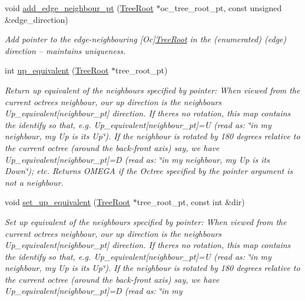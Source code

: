 \begin{DoxyCompactItemize}
void \hyperlink{classoomph_1_1OcTreeRoot_a92ccf3b396de331440c5dcba2e024317}{add\+\_\+edge\+\_\+neighbour\+\_\+pt} (\hyperlink{classoomph_1_1TreeRoot}{Tree\+Root} $\ast$oc\+\_\+tree\+\_\+root\+\_\+pt, const unsigned \&edge\+\_\+direction)
\begin{DoxyCompactList}\small\item\em Add pointer to the edge-\/neighbouring \mbox{[}Oc\mbox{]}\hyperlink{classoomph_1_1TreeRoot}{Tree\+Root} in the (enumerated) (edge) direction -- maintains uniqueness. \end{DoxyCompactList}\item 
int \hyperlink{classoomph_1_1OcTreeRoot_a961a28583236f1b92bc35de064d2dba6}{up\+\_\+equivalent} (\hyperlink{classoomph_1_1TreeRoot}{Tree\+Root} $\ast$tree\+\_\+root\+\_\+pt)
\begin{DoxyCompactList}\small\item\em Return up equivalent of the neighbours specified by pointer\+: When viewed from the current octree\textquotesingle{}s neighbour, our up direction is the neighbour\textquotesingle{}s Up\+\_\+equivalent\mbox{[}neighbour\+\_\+pt\mbox{]} direction. If there\textquotesingle{}s no rotation, this map contains the identify so that, e.\+g. {\ttfamily Up\+\_\+equivalent}\mbox{[}neighbour\+\_\+pt\mbox{]}=U (read as\+: \char`\"{}in my
neighbour, my Up is its Up\char`\"{}). If the neighbour is rotated by 180 degrees relative to the current octree (around the back-\/front axis) say, we have {\ttfamily Up\+\_\+equivalent}\mbox{[}neighbour\+\_\+pt\mbox{]}=D (read as\+: \char`\"{}in my 
neighbour, my Up is its Down\char`\"{}); etc. Returns O\+M\+E\+GA if the Octree specified by the pointer argument is not a neighbour. \end{DoxyCompactList}\item 
void \hyperlink{classoomph_1_1OcTreeRoot_a91210b8fab8bb9f092518303551e0c33}{set\+\_\+up\+\_\+equivalent} (\hyperlink{classoomph_1_1TreeRoot}{Tree\+Root} $\ast$tree\+\_\+root\+\_\+pt, const int \&dir)
\begin{DoxyCompactList}\small\item\em Set up equivalent of the neighbours specified by pointer\+: When viewed from the current octree\textquotesingle{}s neighbour, our up direction is the neighbour\textquotesingle{}s Up\+\_\+equivalent\mbox{[}neighbour\+\_\+pt\mbox{]} direction. If there\textquotesingle{}s no rotation, this map contains the identify so that, e.\+g. {\ttfamily Up\+\_\+equivalent}\mbox{[}neighbour\+\_\+pt\mbox{]}=U (read as\+: \char`\"{}in my
neighbour, my Up is its Up\char`\"{}). If the neighbour is rotated by 180 degrees relative to the current octree (around the back-\/front axis) say, we have {\ttfamily Up\+\_\+equivalent}\mbox{[}neighbour\+\_\+pt\mbox{]}=D (read as\+: \char`\"{}in my 

\end{DoxyCompactList}
\end{DoxyCompactItemize}
